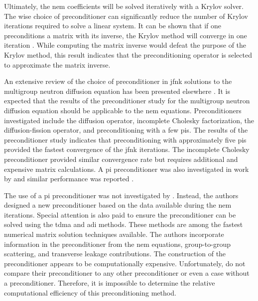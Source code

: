      Ultimately, the \gls{nem} coefficients will be solved iteratively with a
      Krylov solver. The wise choice of preconditioner can significantly reduce
      the number of Krylov iterations required to solve a linear system. It can
      be shown that if one preconditions a matrix with its inverse, the Krylov
      method will converge in one iteration \cite{textbookkelley}. While
      computing the matrix inverse would defeat the purpose of the Krylov
      method, this result indicates that the preconditioning operator is
      selected to approximate the matrix inverse.

      An extensive review of the choice of preconditioner in \gls{jfnk}
      solutions to the multigroup neutron diffusion equation has been presented
      elsewhere \cite{gill_azmy}. It is expected that the results of the
      preconditioner study for the multigroup neutron diffusion equation should
      be applicable to the \gls{nem} equations. Preconditioners investigated
      include the diffusion operator, incomplete Cholesky factorization, the
      diffusion-fission operator, and preconditioning with a few \glspl{pi}. The
      results of the preconditioner study indicates that preconditioning with
      approximately five \glspl{pi} provided the fastest convergence of the
      \gls{jfnk} iterations. The incomplete Cholesky preconditioner provided
      similar convergence rate but requires additional and expensive matrix
      calculations. A \gls{pi} preconditioner was also investigated in work by
      \citeauthor{jfnk_wielandt} and similar performance was reported
      \cite{jfnk_wielandt}.

      The use of a \gls{pi} preconditioner was not investigated by
      \citeauthor{qe2paper}. Instead, the authors designed a new preconditioner
      based on the data available during the \gls{nem} iterations. Special
      attention is also paid to ensure the preconditioner can be solved using
      the \gls{tdma} and \gls{adi} methods. These methods are among the fastest
      numerical matrix solution techniques available. The authors incorporate
      information in the preconditioner from the \gls{nem} equations,
      group-to-group scattering, and transverse leakage contributions. The
      construction of the preconditioner appears to be computationally
      expensive. Unfortunately, \citeauthor{qe2paper} do not compare their
      preconditioner to any other preconditioner or even a case without a
      preconditioner. Therefore, it is impossible to determine the relative
      computational efficiency of this preconditioning method.

